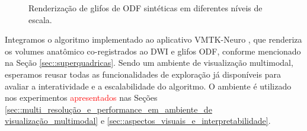 \begin{figure}[ht]
     \caption{Renderização de glifos de ODF sintéticas em diferentes níveis de escala.}
    \label{fig::ambiente_validacao}
\end{figure}



Integramos o algoritmo implementado ao aplicativo VMTK-Neuro \cite{VMTKNeuro}, que renderiza os volumes anatômico co-registrados ao DWI e glifos ODF, conforme mencionado na Seção \ref{sec::superquadricas}. Sendo um ambiente de visualização multimodal, esperamos reusar todas as funcionalidades de exploração já disponíveis para avaliar a interatividade e a escalabilidade do algoritmo. O ambiente é utilizado nos experimentos \textcolor{red}{apresentados} nas Seções \ref{sec::multi_resolução_e_performance_em_ambiente_de visualização_multimodal} e \ref{sec::aspectos_visuais_e_interpretabilidade}.







